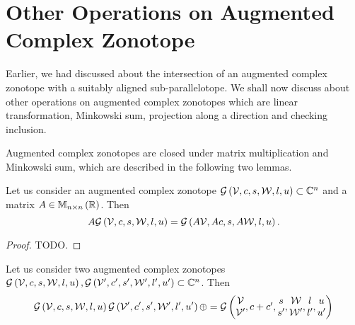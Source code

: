\section{Other Operations on Augmented Complex Zonotope}
Earlier, we had discussed about the intersection of an augmented
complex zonotope with a suitably aligned sub-parallelotope.  We shall
now discuss about other operations on augmented complex zonotopes which
are linear transformation, Minkowski sum, projection along a direction
and checking inclusion.

Augmented complex zonotopes are closed under matrix multiplication and
Minkowski sum, which are described in the following two lemmas.
%
\begin{lemma}
Let us consider an augmented complex zonotope
$\mathcal{G}\left(\mathcal{V},c,s,\mathcal{W},l,u\right)\subset \mathbb{C}^n$
and a matrix $A\in\mathbb{M}_{n\times n}\left(\mathbb{R}\right)$.  Then
%
\[
A\mathcal{G}\left(\mathcal{V},c,s,\mathcal{W},l,u\right)=\mathcal{G}\left(A\mathcal{V},Ac,s,A\mathcal{W},l,u\right).
\]
%
\end{lemma}
%
\begin{proof}
{\color{red} TODO}.
\end{proof}
%
\begin{lemma}
Let us consider two augmented complex zonotopes
$\mathcal{G}\left(\mathcal{V},c,s,\mathcal{W},l,u\right),
\mathcal{G}\left(\mathcal{V}^\prime,c^\prime,s^\prime,\mathcal{W}^\prime,l^\prime,u^\prime\right)\subset\mathbb{C}^n$.
Then
%
\begin{align*}
\mathcal{G}\left(\mathcal{V},c,s,\mathcal{W},l,u\right)
  \mathcal{G}\left(\mathcal{V}^\prime,c^\prime,s^\prime,\mathcal{W}^\prime,l^\prime,u^\prime\right)\oplus = \mathcal{G}\left(\begin{matrix}
    \mathcal{V}\\
    \mathcal{V}^\prime
  \end{matrix}
,\begin{matrix}
    c+c^\prime
  \end{matrix}
,\begin{matrix}
    s\\
    s^\prime
  \end{matrix}
,\begin{matrix}
    \mathcal{W}\\
    \mathcal{W}^\prime
  \end{matrix}
,\begin{matrix}
    l\\
    l^\prime
  \end{matrix}
,\begin{matrix}
    u\\
    u^\prime
  \end{matrix}
\right)
\end{align*}
%
\end{lemma}
%
